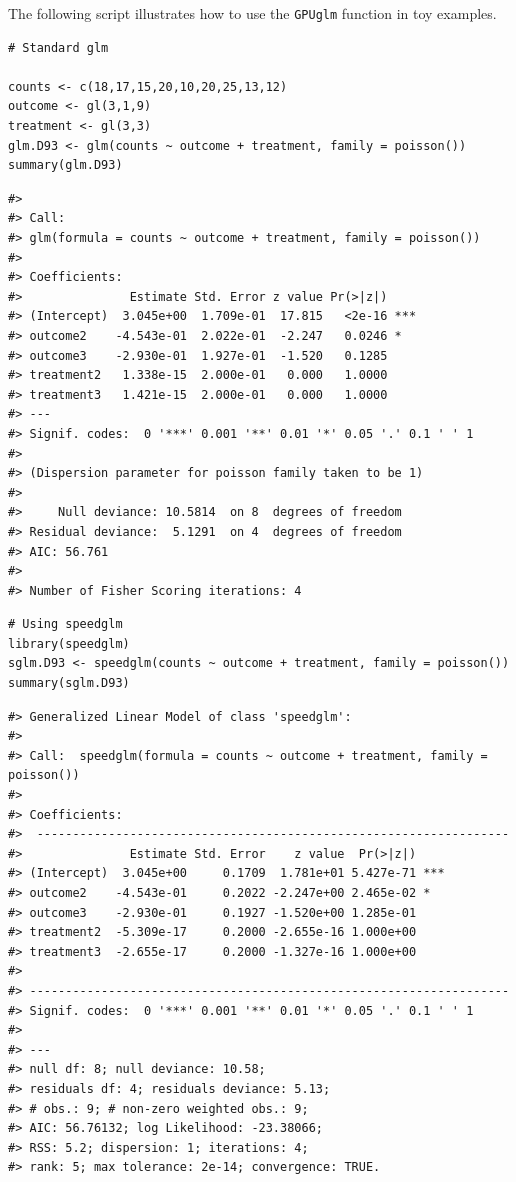 The following script illustrates how to use the \texttt{GPUglm} function in toy examples.

\begin{verbatim}
# Standard glm

counts <- c(18,17,15,20,10,20,25,13,12)
outcome <- gl(3,1,9)
treatment <- gl(3,3)
glm.D93 <- glm(counts ~ outcome + treatment, family = poisson())
summary(glm.D93)
\end{verbatim}

\begin{verbatim}
#> 
#> Call:
#> glm(formula = counts ~ outcome + treatment, family = poisson())
#> 
#> Coefficients:
#>               Estimate Std. Error z value Pr(>|z|)    
#> (Intercept)  3.045e+00  1.709e-01  17.815   <2e-16 ***
#> outcome2    -4.543e-01  2.022e-01  -2.247   0.0246 *  
#> outcome3    -2.930e-01  1.927e-01  -1.520   0.1285    
#> treatment2   1.338e-15  2.000e-01   0.000   1.0000    
#> treatment3   1.421e-15  2.000e-01   0.000   1.0000    
#> ---
#> Signif. codes:  0 '***' 0.001 '**' 0.01 '*' 0.05 '.' 0.1 ' ' 1
#> 
#> (Dispersion parameter for poisson family taken to be 1)
#> 
#>     Null deviance: 10.5814  on 8  degrees of freedom
#> Residual deviance:  5.1291  on 4  degrees of freedom
#> AIC: 56.761
#> 
#> Number of Fisher Scoring iterations: 4
\end{verbatim}

\begin{verbatim}
# Using speedglm
library(speedglm)
sglm.D93 <- speedglm(counts ~ outcome + treatment, family = poisson())
summary(sglm.D93)
\end{verbatim}

\begin{verbatim}
#> Generalized Linear Model of class 'speedglm':
#> 
#> Call:  speedglm(formula = counts ~ outcome + treatment, family = poisson()) 
#> 
#> Coefficients:
#>  ------------------------------------------------------------------ 
#>               Estimate Std. Error    z value  Pr(>|z|)    
#> (Intercept)  3.045e+00     0.1709  1.781e+01 5.427e-71 ***
#> outcome2    -4.543e-01     0.2022 -2.247e+00 2.465e-02 *  
#> outcome3    -2.930e-01     0.1927 -1.520e+00 1.285e-01    
#> treatment2  -5.309e-17     0.2000 -2.655e-16 1.000e+00    
#> treatment3  -2.655e-17     0.2000 -1.327e-16 1.000e+00    
#> 
#> ------------------------------------------------------------------- 
#> Signif. codes:  0 '***' 0.001 '**' 0.01 '*' 0.05 '.' 0.1 ' ' 1 
#> 
#> ---
#> null df: 8; null deviance: 10.58;
#> residuals df: 4; residuals deviance: 5.13;
#> # obs.: 9; # non-zero weighted obs.: 9;
#> AIC: 56.76132; log Likelihood: -23.38066;
#> RSS: 5.2; dispersion: 1; iterations: 4;
#> rank: 5; max tolerance: 2e-14; convergence: TRUE.
\end{verbatim}

